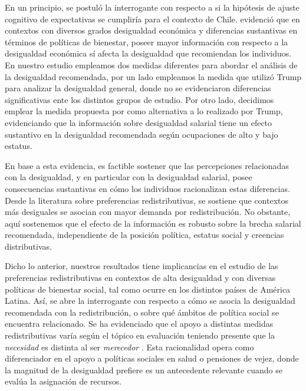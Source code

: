 \documentclass[12pt]{article}
\begin{document}
En un principio, se postuló la interrogante con respecto a si la hipótesis de ajuste cognitivo de expectativas se cumpliría para el contexto de Chile. \cite{Trump2017} evidenció que en contextos con diversos grados desigualdad económica y diferencias sustantivas en términos de políticas de bienestar, poseer mayor información con respecto a la desigualdad económica sí afecta la desigualdad que recomiendan los individuos. En nuestro estudio empleamos dos medidas diferentes para abordar el análisis de la desigualdad recomendada, por un lado empleamos la medida que utilizó Trump para analizar la desigualdad general, donde no se evidenciaron diferencias significativas ente los distintos grupos de estudio. Por otro lado, decidimos emplear la medida propuesta por \cite{Jasso1999} como alternativa a lo realizado por Trump, evidenciando que la información sobre desigualdad salarial tiene un efecto sustantivo en la desigualdad recomendada según ocupaciones de alto y bajo estatus.

En base a esta evidencia, es factible sostener que las percepciones relacionadas con la desigualdad, y en particular con la desigualdad salarial, posee consecuencias sustantivas en cómo los individuos racionalizan estas diferencias. Desde la literatura sobre preferencias redistributivas, se sostiene que contextos más desiguales se asocian con mayor demanda por redistribución. No obstante, aquí sostenemos que el efecto de la información es robusto sobre la brecha salarial recomendada, independiente de la posición política, estatus social y creencias distributivas. 

Dicho lo anterior, nuestros resultados tiene implicancias en el estudio de las preferencias redistributivas en contextos de alta desigualdad y con diversas políticas de bienestar social, tal como ocurre en los distintos países de América Latina. Así,  se abre la interrogante con respecto a cómo se asocia la desigualdad recomendada con la redistribución, o sobre qué ámbitos de política social se encuentra relacionado. Se ha evidenciado que el apoyo a distintas medidas redistributivas varía según el tópico en evaluación teniendo presente que la \textit{necesidad} es distinta al ser \textit{merecedor} \citep{Jensen2017,Aaroe2014}. Esta racionalidad opera como diferenciador en el apoyo a políticas sociales en salud o pensiones de vejez, donde la magnitud de la desigualdad  prefiere es un antecedente relevante cuando se evalúa la asignación de recursos.        
 
\end{document}
